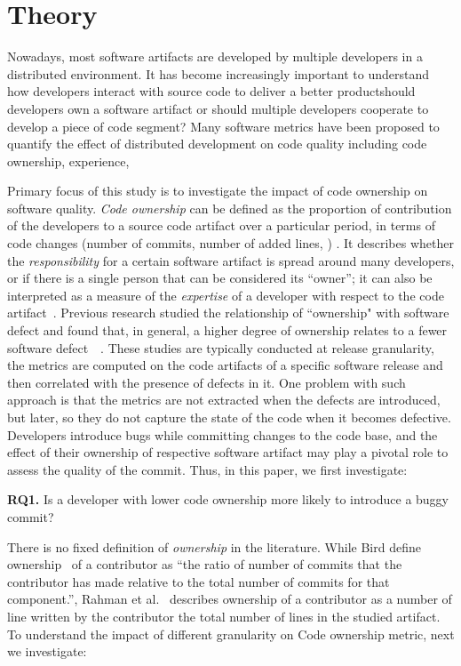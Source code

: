 
\section{Theory}
\label{sec:prob}

Nowadays, most software artifacts are developed by multiple developers in a distributed environment. It has become increasingly important to understand how developers interact with source code to deliver a better product\textemdash should developers own a software artifact or should multiple developers cooperate to develop a piece of code segment? Many software metrics have been proposed to quantify the effect of distributed development on code quality including code ownership, experience, \etc 

Primary focus of this study is to investigate the impact of code ownership on software quality. {\em Code ownership} can be defined as the proportion of contribution of the developers to a source code artifact over a particular period, in terms of code changes (\eg number of commits, number of added lines, \etc) \cite{Greiler:replication}. It describes whether the \textit{responsibility} for a certain software artifact is spread around many developers, or if there is a single person that can be considered its ``owner'';  it can also be interpreted as a measure of the \textit{expertise} of a developer with respect to the code artifact~\cite{bird:original}.  Previous research studied the relationship of ``ownership" with software defect and found that, in general, a higher degree of ownership relates to a fewer software defect~\cite{bird:original}~. These studies are typically conducted at release granularity, 
\ie the metrics are computed on the code artifacts of a specific software release and then correlated with the presence of defects in it. 
One problem with such approach is that the metrics are not extracted when the defects are introduced, but later, so they do not capture the state of the code when it becomes defective. Developers introduce bugs while committing changes to the code base, and the effect of their ownership of respective software artifact may play a pivotal role to assess the quality of the commit.  Thus, in this paper, we first investigate:

\textbf{RQ1.} Is a developer with lower code ownership more likely to introduce a buggy commit?

There is no fixed definition of {\em ownership} in the literature. While Bird \etal define ownership~\cite{bird:original} of a contributor as ``the ratio of number of commits that the contributor has made relative to the total
number of commits for that component.'', Rahman et al.~\cite{Rahman:blame} describes ownership of a contributor as a number of line written by the contributor \wrt the total number of lines in the studied artifact. To understand the impact of different granularity on Code ownership metric, next we investigate: 

